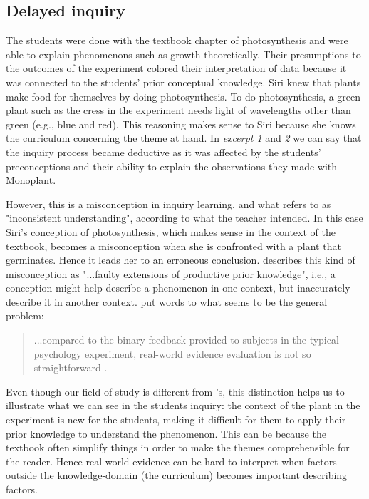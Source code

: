 \subsection{Delayed inquiry}
The students were done with the textbook chapter of photosynthesis and were able to explain phenomenons such as growth theoretically. Their presumptions to the outcomes of the experiment colored their interpretation of data because it was connected to the students' prior conceptual knowledge. Siri knew that plants make food for themselves by doing photosynthesis. To do photosynthesis, a green plant such as the cress in the experiment needs light of wavelengths other than green (e.g., blue and red). This reasoning makes sense to Siri because she knows the curriculum concerning the theme at hand. In \emph{excerpt 1} and \emph{2} we can say that the inquiry process became deductive as it was affected by the students' preconceptions and their ability to explain the observations they made with Monoplant.

However, this is a misconception in inquiry learning, and what \citet{gomez2008elementary} refers to as "inconsistent understanding", according to what the teacher intended. In this case Siri's conception of photosynthesis, which makes sense in the context of the textbook, becomes a misconception when she is confronted with a plant that germinates. Hence it leads her to an erroneous conclusion. \citet[p. 512]{smith1994misconceptions} describes this kind of misconception as "...faulty extensions of productive prior knowledge", i.e., a conception might help describe a phenomenon in one context, but inaccurately describe it in another context. \citeauthor*{klahr1993heuristics} put words to what seems to be the general problem: 

\begin{quote}...compared to the binary feedback provided to subjects in the typical psychology experiment, real-world evidence evaluation is not so straightforward \citetext{\citealp{klahr1993heuristics}, referenced in \citealp{de1998scientific}, p. 186}.
\end{quote}

Even though our field of study is different from \citeauthor{klahr1993heuristics}'s, this distinction helps us to illustrate what we can see in the students inquiry: the context of the plant in the experiment is new for the students, making it difficult for them to apply their prior knowledge to understand the phenomenon. This can be because the textbook often simplify things in order to make the themes comprehensible for the reader. Hence real-world evidence can be hard to interpret when factors outside the knowledge-domain (the curriculum) becomes important describing factors.

